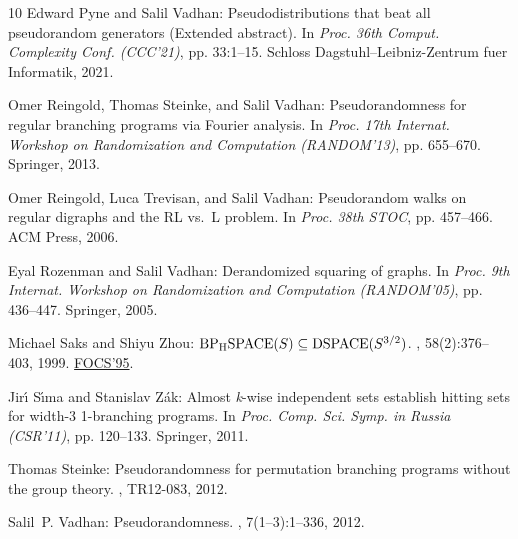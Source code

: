 \documentclass[11pt]{article}
\begin{document}
\begin{thebibliography}{10}
{\sc Edward Pyne and Salil Vadhan}: Pseudodistributions that beat all
  pseudorandom generators ({E}xtended abstract).
\newblock In {\em Proc. 36th Comput. Complexity Conf. (CCC'21)}, pp. 33:1--15.
  Schloss Dagstuhl--Leibniz-Zentrum fuer Informatik, 2021.

{\sc Omer Reingold, Thomas Steinke, and Salil Vadhan}: Pseudorandomness for
  regular branching programs via {F}ourier analysis.
\newblock In {\em Proc. 17th Internat. Workshop on Randomization and
  Computation (RANDOM'13)}, pp. 655--670. Springer, 2013.
\newblock [\epfmtdoi{10.1007/978-3-642-40328-6\_45}]

{\sc Omer Reingold, Luca Trevisan, and Salil Vadhan}: Pseudorandom walks on
  regular digraphs and the \mbox{RL} vs.\ \mbox{L} problem.
\newblock In {\em Proc. 38th STOC}, pp. 457--466. ACM Press, 2006.

{\sc Eyal Rozenman and Salil Vadhan}: Derandomized squaring of graphs.
\newblock In {\em Proc. 9th Internat. Workshop on Randomization and Computation
  (RANDOM'05)}, pp. 436--447. Springer, 2005.
\newblock [\epfmtdoi{10.1007/11538462\_37}]

{\sc Michael Saks and Shiyu Zhou}: {${\rm BP}\sb {\rm H}{\rm
  SPACE}(S)\subseteq{\rm DSPACE}(S\sp {3/2})$}.
, 58(2):376--403, 1999.
\newblock \prelim \href{https://doi.org/10.1109/SFCS.1995.492490}{FOCS'95}.

{\sc Jir\'{\i} S\'{\i}ma and Stanislav Z{\'a}k}: Almost {\it k}-wise
  independent sets establish hitting sets for width-3 1-branching programs.
\newblock In {\em Proc. Comp. Sci. Symp. in Russia (CSR'11)}, pp. 120--133.
  Springer, 2011.
\newblock [\epfmtdoi{10.1007/978-3-642-20712-9\_10}]

{\sc Thomas Steinke}: Pseudorandomness for permutation branching programs
  without the group theory.
, TR12-083, 2012.

{\sc Salil~P. Vadhan}: Pseudorandomness.
, 7(1--3):1--336, 2012.
\newblock [\epfmtdoi{10.1561/0400000010}]


\end{thebibliography}
\end{document}
